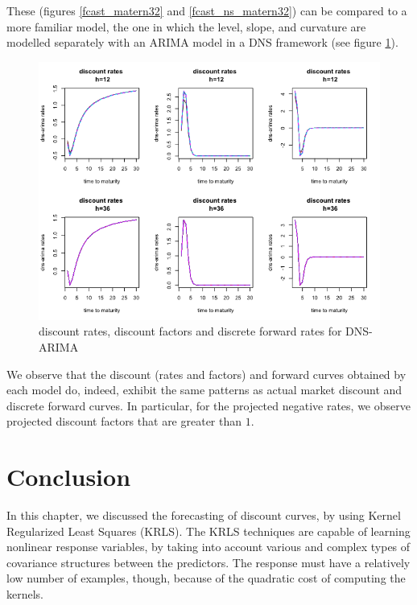 \newpage

These (figures \ref{fcast_matern32} and \ref{fcast_ns_matern32}) can be compared to a more familiar model, the one in which the level, slope, and curvature are modelled separately with an ARIMA model in a DNS framework (see figure \ref{fcast_ns_arima}). 

\begin{figure}[!htb]
\centering
\includegraphics[width=12.5cm]{gfx/chapter-krls-models/fcast_ns_arima}
\caption{discount rates, discount factors and discrete forward rates for DNS-ARIMA}
\label{fcast_ns_arima}
\end{figure}

We observe that the discount (rates and factors) and forward curves obtained by each model do, indeed, exhibit the same patterns as actual market discount and discrete forward curves. In particular, for the projected negative rates, we observe projected discount factors that are greater than $1$. 


\section{Conclusion}

In this chapter, we discussed the forecasting of discount curves, by using Kernel Regularized Least Squares (KRLS). The KRLS techniques are capable of learning nonlinear response variables, by taking into account various and complex types of covariance structures between the predictors. The response must have a relatively low number of examples, though, because of the quadratic cost of computing the kernels. 

